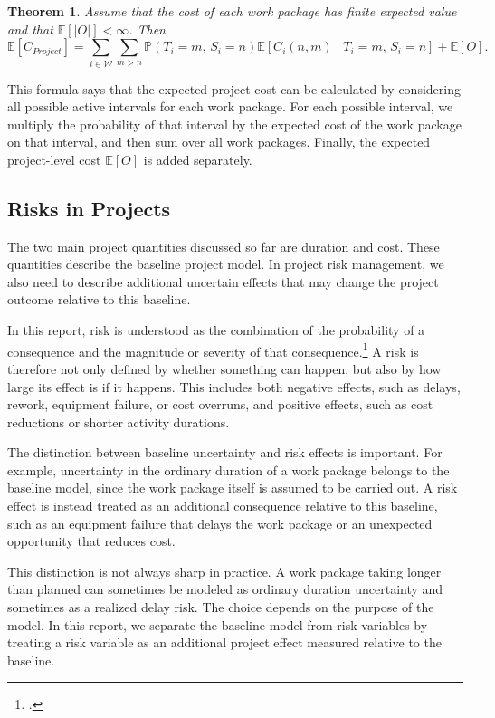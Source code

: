 \documentclass[11pt,a4paper]{article}
\providecommand{\E}{\mathbb{E}}
\newcommand{\cW}{\mathcal{W}}
\newcommand{\pP}{\mathbb{P}}
\newcommand{\E}{\mathbb{E}}
\newcommand{\1}{\mathbf{1}}
\theoremstyle{definition}
\theoremstyle{plain}
\newtheorem{theorem}{Theorem}[section]
\theoremstyle{remark}
\numberwithin{equation}{section}
\begin{document}
\begin{theorem}
Assume that the cost of each work package has finite expected value and that $\E[|O|]<\infty$. Then
\[
\E[C_{Project}]
=
\sum_{i\in\cW}
\sum_{m>n}
\pP(T_i=m,\,S_i=n)
\E\left[
C_i(n,m)
\mid
T_i=m,\,S_i=n
\right]
+
\E[O].
\]
\end{theorem}

This formula says that the expected project cost can be calculated by considering all possible active intervals for each work package. For each possible interval, we multiply the probability of that interval by the expected cost of the work package on that interval, and then sum over all work packages. Finally, the expected project-level cost $\E[O]$ is added separately.

\subsection{Risks in Projects}

The two main project quantities discussed so far are duration and cost. These quantities describe the baseline project model. In project risk management, we also need to describe additional uncertain effects that may change the project outcome relative to this baseline.

In this report, risk is understood as the combination of the probability of a consequence and the magnitude or severity of that consequence.\footcite[4]{sraGlossary2018} A risk is therefore not only defined by whether something can happen, but also by how large its effect is if it happens. This includes both negative effects, such as delays, rework, equipment failure, or cost overruns, and positive effects, such as cost reductions or shorter activity durations.

The distinction between baseline uncertainty and risk effects is important. For example, uncertainty in the ordinary duration of a work package belongs to the baseline model, since the work package itself is assumed to be carried out. A risk effect is instead treated as an additional consequence relative to this baseline, such as an equipment failure that delays the work package or an unexpected opportunity that reduces cost.

This distinction is not always sharp in practice. A work package taking longer than planned can sometimes be modeled as ordinary duration uncertainty and sometimes as a realized delay risk. The choice depends on the purpose of the model. In this report, we separate the baseline model from risk variables by treating a risk variable as an additional project effect measured relative to the baseline. \newpage
\end{document}
